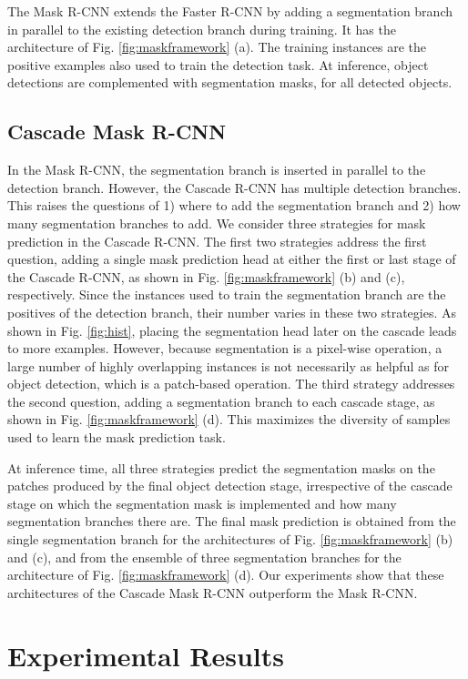 \documentclass[10pt,journal,compsoc]{IEEEtran}
\begin{document}
The Mask R-CNN \cite{he2017mask} extends the Faster R-CNN by adding a
segmentation branch in parallel to the existing detection branch during training. It has the architecture of
Fig. \ref{fig:maskframework} (a). The training instances are the positive
examples also used to train the detection task. At inference, object detections
are complemented with segmentation masks, for all detected
objects.

\subsection{Cascade Mask R-CNN}

In the Mask R-CNN, the segmentation branch is inserted in parallel to the
detection branch. However, the Cascade R-CNN has multiple
detection branches. This raises the questions of 1) where to add the
segmentation branch and 2) how many segmentation branches to add.
We consider three strategies for mask prediction in the Cascade R-CNN.
The first two strategies address the first question, adding a single mask prediction head at either the first or last stage of the Cascade R-CNN, as shown in
Fig. \ref{fig:maskframework} (b) and (c), respectively.
Since the instances used to train the segmentation branch are
the positives of the detection branch, their number varies in these two
strategies. As shown in Fig. \ref{fig:hist}, placing the
segmentation head later on the cascade leads to more examples.
However, because segmentation is a pixel-wise operation, a large number
of highly overlapping instances is not necessarily as helpful as for object
detection, which is a patch-based operation. The third strategy
addresses the second question, adding a segmentation branch to each cascade
stage, as shown in Fig. \ref{fig:maskframework} (d).
This maximizes the diversity of samples used to learn the mask prediction
task.

At inference time, all three strategies predict the segmentation masks on the
patches produced by the final object detection stage, irrespective
of the cascade stage on which the segmentation mask is implemented and
how many segmentation branches there are. The final mask prediction is
obtained from the single segmentation branch for the architectures of
Fig. \ref{fig:maskframework} (b) and (c), and from the ensemble of three
segmentation branches for the architecture of Fig. \ref{fig:maskframework} (d).
Our experiments show that these
architectures of the Cascade Mask R-CNN outperform the Mask R-CNN.


\section{Experimental Results}
\end{document}
